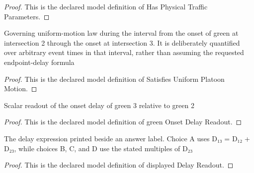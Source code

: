 \begin{proof}
  This is the declared model definition of Has Physical Traffic Parameters.
\end{proof}
\begin{definition}
  \label{def:physics:phyx-mini-0732:phyxminiproblems-problemphyxmini0732-satisfiesuniformplatoonmotion}
  Governing uniform-motion law during the interval from the onset of green at intersection 2 through the onset at intersection 3. It is deliberately quantified over arbitrary event times in that interval, rather than assuming the requested endpoint-delay formula
\end{definition}
\begin{proof}
  This is the declared model definition of Satisfies Uniform Platoon Motion.
\end{proof}
\begin{definition}
  \label{def:physics:phyx-mini-0732:phyxminiproblems-problemphyxmini0732-greenonsetdelayreadout}
  Scalar readout of the onset delay of green 3 relative to green 2
\end{definition}
\begin{proof}
  This is the declared model definition of green Onset Delay Readout.
\end{proof}
\begin{definition}
  \label{def:physics:phyx-mini-0732:phyxminiproblems-problemphyxmini0732-displayeddelayreadout}
  The delay expression printed beside an answer label. Choice A uses D₁₃ = D₁₂ + D₂₃, while choices B, C, and D use the stated multiples of D₂₃
\end{definition}
\begin{proof}
  This is the declared model definition of displayed Delay Readout.
\end{proof}
